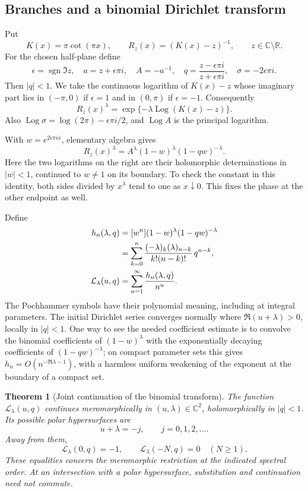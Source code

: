 \documentclass[11pt]{article}
\numberwithin{equation}{section}
\theoremstyle{plain}
\newtheorem{theorem}{Theorem}[section]
\theoremstyle{definition}
\theoremstyle{remark}
\DeclareMathOperator{\Log}{Log}
\begin{document}
\subsection{Branches and a binomial Dirichlet transform}

Put
\[
 K(x)=\pi\cot(\pi x),\qquad R_z(x)=(K(x)-z)^{-1},
 \qquad z\in\mathbb C\setminus\mathbb R.
\]
For the chosen half-plane define
\[
 \epsilon=\operatorname{sgn}\Im z,\quad
 a=z+\epsilon\pi i,\quad A=-a^{-1},\quad
 q=\frac{z-\epsilon\pi i}{z+\epsilon\pi i},\quad
 \sigma=-2\epsilon\pi i.
\]
Then \(|q|<1\).  We take the continuous logarithm of \(K(x)-z\)
whose imaginary part lies in \((-\pi,0)\) if \(\epsilon=1\) and
in \((0,\pi)\) if \(\epsilon=-1\).  Consequently
\[
 R_z(x)^\lambda=\exp\{-\lambda\Log(K(x)-z)\}.
\]
Also \(\Log\sigma=\log(2\pi)-\epsilon\pi i/2\), and
\(\Log A\) is the principal logarithm.

With \(w=e^{2\epsilon\pi i x}\), elementary algebra gives
\begin{equation}\label{bhr:cxp:eq:disk}
 R_z(x)^\lambda
 =A^\lambda(1-w)^\lambda(1-qw)^{-\lambda}.
\end{equation}
Here the two logarithms on the right are their holomorphic
determinations in \(|w|<1\), continued to \(w\ne1\) on its boundary.
To check the constant in this identity, both sides divided by
\(x^\lambda\) tend to one as \(x\downarrow0\).  This fixes the phase
at the other endpoint as well.

Define
\begin{align}
 h_n(\lambda,q)
 &=[w^n](1-w)^\lambda(1-qw)^{-\lambda}\notag\\
 &=\sum_{k=0}^n
   \frac{(-\lambda)_k(\lambda)_{n-k}}{k!(n-k)!}\,q^{n-k},
 \label{bhr:cxp:eq:hn}\\
 \mathcal L_\lambda(u,q)
 &=\sum_{n=1}^{\infty}\frac{h_n(\lambda,q)}{n^u}.
 \label{bhr:cxp:eq:L}
\end{align}
The Pochhammer symbols have their polynomial meaning, including at
integral parameters.  The initial Dirichlet series converges normally
where \(\Re(u+\lambda)>0\), locally in \(|q|<1\).  One way to see
the needed coefficient estimate is to convolve the binomial
coefficients of \((1-w)^\lambda\) with the exponentially decaying
coefficients of \((1-qw)^{-\lambda}\); on compact parameter sets this
gives \(h_n=O(n^{-\Re\lambda-1})\), with a harmless uniform weakening
of the exponent at the boundary of a compact set.

\begin{theorem}[Joint continuation of the binomial transform]
\label{bhr:cxp:thm:L}
The function \(\mathcal L_\lambda(u,q)\) continues meromorphically
in \((u,\lambda)\in\mathbb C^2\), holomorphically in \(|q|<1\).
Its possible polar hypersurfaces are
\[
 u+\lambda=-j,\qquad j=0,1,2,\ldots.
\]
Away from them,
\[
 \mathcal L_\lambda(0,q)=-1,\qquad
 \mathcal L_\lambda(-N,q)=0\quad(N\ge1).
\]
These equalities concern the meromorphic restriction at the indicated
spectral order.  At an intersection with a polar hypersurface,
substitution and continuation need not commute.
\end{theorem}
\end{document}
